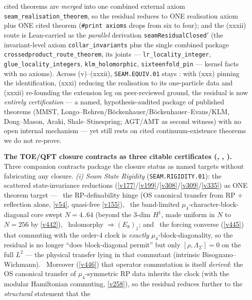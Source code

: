 cited theorems are \emph{merged} into one combined external axiom \texttt{seam\_realisation\_theorem}, so the residual
reduces to ONE realisation axiom plus ONE cited theorem (\texttt{\#print axioms} drops from six to four); and the
(xxxii) route is Lean-carried as the \emph{parallel} derivation \texttt{seamResidualClosed$'$} (the invariant-level
axiom \texttt{collar\_invariants} plus the single combined package \texttt{crossedproduct\_route\_theorem}, its
joints --- \texttt{lr\_locality\_integer}, \texttt{glue\_locality\_integers}, \texttt{klm\_holomorphic},
\texttt{sixteenfold\_pin} --- kernel facts with no axioms). Across
(v)--(xxxii), \texttt{SEAM.EQUIV.01}
stays \mO: with (xxx) pinning the identification, (xxxi) reducing the realisation to its one-particle data and
(xxxii) re-founding the extension leg on peer-reviewed ground, the
residual is now \emph{entirely certification} --- a named, hypothesis-audited package of published theorems (MMST,
Longo--Rehren/B\"ockenhauer/B\"ockenhauer--Evans/KLM, Dong--Mason, Araki, Shale--Stinespring; AGT/AMT as second
witness) with no open internal mechanism --- yet still rests on cited
continuum-existence theorems we do not re-prove.
\par\smallskip\noindent\textbf{The TOE/QFT closure contracts as three citable certificates
(, , ).}
Three companion contracts package the closure status as named targets without fabricating any closure.
\emph{(i) Seam State Rigidity} (\texttt{SEAM.RIGIDITY.01}): the scattered state-invariance reductions
(\vref{v177}/\vref{v199}/\vref{v308}/\vref{v309}/\vref{v335}) as ONE theorem target --- \mE\ the RP-definability
hinge (OS canonical transfer from RP $+$ reflection alone, \vref{v54}, quasi-free \vref{v155}), \mE\ the band-limited
$\mu_4$-character-block-diagonal core swept $N{=}4..64$ (beyond the $3$-dim $H^1$, made uniform in $N$ to $N{=}256$
by \vref{v442}), \mE\ holomorphy $\Rightarrow(E_8)_1$; and \mE\ the forcing converse (\vref{v445}) that commuting with
the order-$4$ clock is \emph{exactly} $\mu_4$-block-diagonality, so the residual is no longer ``does block-diagonal
permit'' but only $[\rho,\Lambda_\Sigma]{=}0$ on the full $L^2$ --- the physical transfer lying in that
commutant (intrinsic Bisognano--Wichmann). \mE\ Moreover (\vref{v446}) that operator commutation is itself
\emph{derived}: the OS canonical transfer of $\mu_4$-symmetric RP data inherits the clock (with the modular
Hamiltonian commuting, \vref{v258}), so the residual reduces further to the \emph{structural} statement that the
